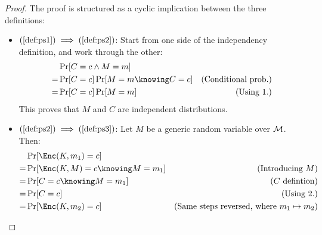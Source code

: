 \begin{proof}
    The proof is structured as a cyclic implication between the three definitions:
    
    \begin{itemize}
        \item $(\ref{def:ps1}) \implies (\ref{def:ps2})$: Start from one side of the independency definition, and work through the other:
        \begin{align*}
             & \Pr[C = c \wedge M = m]              & \\
            =& \Pr[C = c] \Pr[M = m \knowing C = c] & \text{(Conditional prob.)} \\
            =& \Pr[C = c] \Pr[M = m]                & \text{(Using 1.)} \\
        \end{align*}
        This proves that $M$ and $C$ are independent distributions.
        
        \item $(\ref{def:ps2}) \implies (\ref{def:ps3})$: Let $M$ be a generic random variable over $\mathcal{M}$. Then:
        \begin{align*}
             & \Pr[\Enc(K, m_1) = c]                & \\
            =& \Pr[\Enc(K, M) = c \knowing M = m_1] & \text{(Introducing $M$)} \\
            =& \Pr[C = c \knowing M = m_1]          & \text{($C$ defintion)} \\
            =& \Pr[C = c]                           & \text{(Using 2.)} \\
            =& \Pr[\Enc(K, m_2) = c]                & \text{(Same steps reversed, where $m_1 \mapsto m_2$)}\\
        \end{align*}


\end{itemize}
\end{proof}
